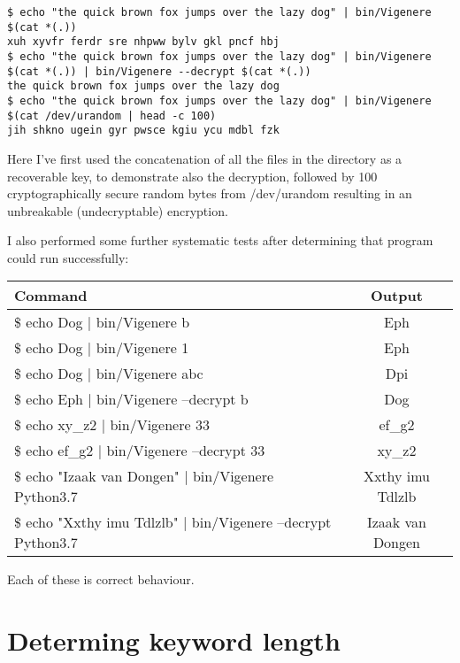 \documentclass{article}
\begin{document}
\begin{lstlisting}[caption=Using the Vigen\`ere program for a one-time pad]
$ echo "the quick brown fox jumps over the lazy dog" | bin/Vigenere $(cat *(.))
xuh xyvfr ferdr sre nhpww bylv gkl pncf hbj
$ echo "the quick brown fox jumps over the lazy dog" | bin/Vigenere $(cat *(.)) | bin/Vigenere --decrypt $(cat *(.))
the quick brown fox jumps over the lazy dog
$ echo "the quick brown fox jumps over the lazy dog" | bin/Vigenere $(cat /dev/urandom | head -c 100)
jih shkno ugein gyr pwsce kgiu ycu mdbl fzk
\end{lstlisting}
\iffalse $ \fi %

    Here I've first used the concatenation of all the files in the directory as
    a recoverable key, to demonstrate also the decryption, followed by 100
    cryptographically secure random bytes from /dev/urandom resulting in an
    unbreakable (undecryptable) encryption.

    I also performed some further systematic tests after determining that
    program could run successfully:

	\begin{center}
		\begin{tabular}{||l | c||} 
		\hline
		Command & Output \\ [0.5ex] 
		\hline\hline
        \$ echo Dog | bin/Vigenere b & Eph \\
        \$ echo Dog | bin/Vigenere 1 & Eph \\
        \$ echo Dog | bin/Vigenere abc & Dpi \\
        \$ echo Eph | bin/Vigenere --decrypt b & Dog \\
        \$ echo xy\_z2 | bin/Vigenere 33 & ef\_g2 \\
        \$ echo ef\_g2 | bin/Vigenere --decrypt 33 & xy\_z2 \\
        \$ echo "Izaak van Dongen" | bin/Vigenere Python3.7 & Xxthy imu Tdlzlb \\
        \$ echo "Xxthy imu Tdlzlb" | bin/Vigenere --decrypt Python3.7 & Izaak van Dongen \\ [1ex] 
        \hline
	\end{tabular}
	\end{center}

    Each of these is correct behaviour.

    \section{Determing keyword length}
\end{document}
